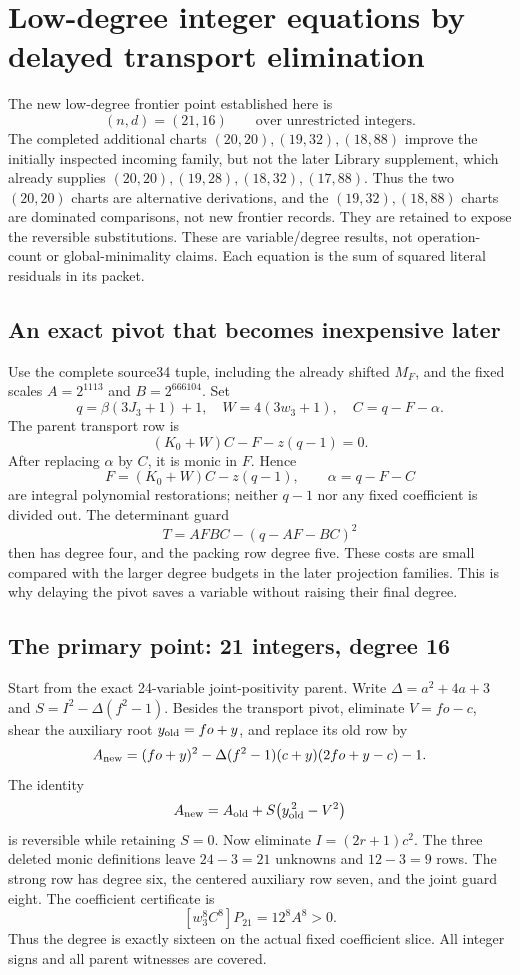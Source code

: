 \section{Low-degree integer equations by delayed transport elimination}
The new low-degree frontier point established here is
\[
 (n,d)=(21,16)\qquad\text{over unrestricted integers}.
\]
The completed additional charts $(20,20),(19,32),(18,88)$ improve the
initially inspected incoming family, but not the later Library supplement,
which already supplies $(20,20),(19,28),(18,32),(17,88)$.
Thus the two $(20,20)$ charts are alternative derivations, and the
$(19,32),(18,88)$ charts are dominated comparisons, not new frontier records.
They are retained to expose the reversible substitutions. These are
variable/degree results, not operation-count or global-minimality claims.
Each equation is the sum of squared literal residuals in its packet.

\subsection{An exact pivot that becomes inexpensive later}
Use the complete source34 tuple, including the already shifted $M_F$,
and the fixed scales $A=2^{1113}$ and $B=2^{666104}$. Set
\[
 q=\beta(3J_3+1)+1,\quad W=4(3w_3+1),\quad
 C=q-F-\alpha.
\]
The parent transport row is
\[
 (K_0+W)C-F-z(q-1)=0.
\]
After replacing $\alpha$ by $C$, it is monic in $F$. Hence
\[
 F=(K_0+W)C-z(q-1),\qquad \alpha=q-F-C
\]
are integral polynomial restorations; neither $q-1$ nor any fixed
coefficient is divided out. The determinant guard
\[
 T=AFBC-(q-AF-BC)^2
\]
then has degree four, and the packing row degree five. These costs are
small compared with the larger degree budgets in the later projection
families. This is why delaying the pivot saves a variable without
raising their final degree.

\subsection{The primary point: 21 integers, degree 16}
Start from the exact 24-variable joint-positivity parent. Write
$\Delta=a^2+4a+3$ and $S=I^2-\Delta(f^2-1)$. Besides the transport
pivot, eliminate $V=fo-c$, shear the auxiliary root
$y_{\rm old}=fo+y$, and replace its old row by
\[
 A_{\rm new}=(fo+y)^2-
 \Delta(f^2-1)(c+y)(2fo+y-c)-1.
\]
The identity
\[
 A_{\rm new}=A_{\rm old}
       +S\bigl(y_{\rm old}^{\,2}-V^2\bigr)
\]
is reversible while retaining $S=0$. Now eliminate
$I=(2r+1)c^2$. The three deleted monic definitions leave
$24-3=21$ unknowns and $12-3=9$ rows. The strong row has degree six,
the centered auxiliary row seven, and the joint guard eight.
The coefficient certificate is
\[
 [w_3^8C^8]P_{21}=12^8A^8>0.
\]
Thus the degree is exactly sixteen on the actual fixed coefficient
slice. All integer signs and all parent witnesses are covered.


